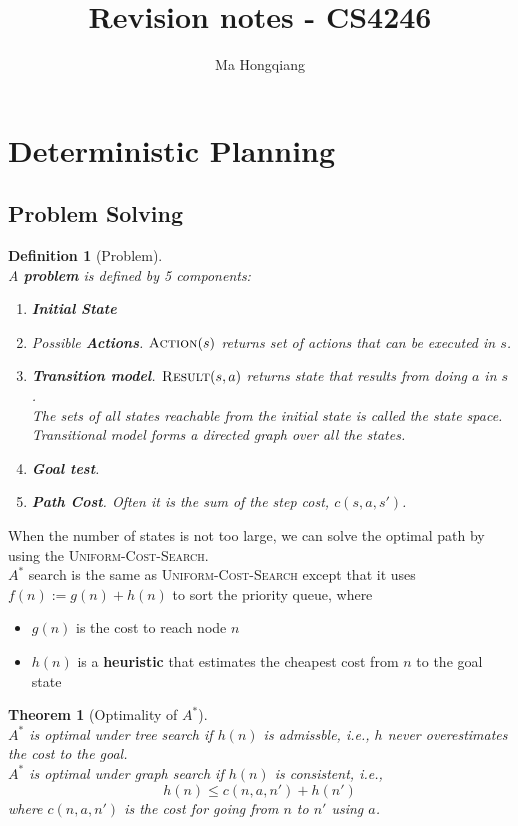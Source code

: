 \documentclass[12pt]{article}
\newtheorem{definition}{Definition}[section]
\newtheorem{theorem}{Theorem}[section]
\theoremstyle{definition}
\begin{document}
\title{Revision notes - CS4246}
\author{Ma Hongqiang}
\maketitle
\tableofcontents

\clearpage
\section{Deterministic Planning}
\subsection{Problem Solving}
\begin{definition}[Problem]
\hfill\\\normalfont A \textbf{problem} is defined by 5 components:
\begin{enumerate}
	\item \textbf{Initial State}
	\item Possible \textbf{Actions}. $\textsc{Action}(s)$ returns set of actions that can be executed in $s$.
	\item \textbf{Transition model}. $\textsc{Result}(s,a)$ returns state that results from doing $a$ in $s$.\\ The sets of all states reachable from the initial state is called the state space. Transitional model forms a directed graph over all the states.
	\item \textbf{Goal test}.
	\item \textbf{Path Cost}. Often it is the sum of the step cost, $c(s,a,s')$.
\end{enumerate}
\end{definition}
When the number of states is not too large, we can solve the optimal path by using the \textsc{Uniform-Cost-Search}. \\
$A^\ast$ search is the same as \textsc{Uniform-Cost-Search} except that it uses $f(n):=g(n)+h(n)$ to sort the priority queue, where
\begin{itemize}
	\item $g(n)$ is the cost to reach node $n$
	\item $h(n)$ is a \textbf{heuristic} that estimates the cheapest cost from $n$ to the goal state
\end{itemize}
\begin{theorem}[Optimality of {$A^\ast$}]
\hfill\\\normalfont $A^\ast$ is optimal under tree search if $h(n)$ is admissble, i.e., $h$ never overestimates the cost to the goal.\\
$A^\ast$ is optimal under graph search if $h(n)$ is consistent, i.e., 
\[
h(n)\leq c(n,a,n')+h(n')
\]
where $c(n,a,n')$ is the cost for going from $n$ to $n'$ using $a$.
\end{theorem}
\end{document}
